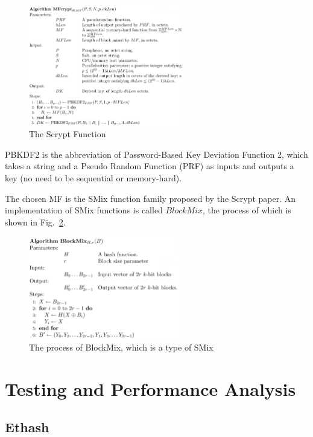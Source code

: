 \documentclass[11pt]{article}
\begin{document}
\begin{figure}[h]
    \centering
    \includegraphics[width=0.6\textwidth]{scrypt_process.eps}
    \caption{The Scrypt Function}
    \label{fig:scrypt_process}
\end{figure}

PBKDF2\cite{percival2016scrypt} is the abbreviation of Password-Based Key Deviation Function 2, which takes a string and a Pseudo Random Function (PRF) as inputs and outputs a key (no need to be sequential or memory-hard).

The chosen MF is the SMix function family proposed by the Scrypt paper. An implementation of SMix functions is called $BlockMix$, the process of which is shown in Fig.~\ref{fig:scrypt_smix}.

\begin{figure}[h]
    \centering
    \includegraphics[width=0.6\textwidth]{scrypt_smix.eps}
    \caption{The process of BlockMix, which is a type of SMix}
    \label{fig:scrypt_smix}
\end{figure}

\section{Testing and Performance Analysis}

\subsection{Ethash}
\end{document}
